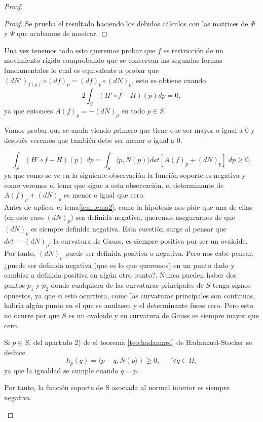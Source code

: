 \begin{proof}
\begin{proof}
		Se prueba el resultado haciendo los debidos cálculos con las matrices de $\Phi$ y $\Psi$ que acabamos de mostrar.
	\end{proof}
	
	Una vez tenemos todo esto queremos probar que $f$ es restricción de un movimiento rígido comprobando que se conservan las segundas formas fundamentales lo cual es equivalente a probar que $(dN')_{f(p)} \circ (df)_p = (df)_p \circ (dN)_p$, esto se obtiene cuando
	\[
		2\int_S (H' \circ f - H)(p) dp = 0,
	\]
	ya que entonces $A(f)_p = -(dN)_p$ en todo $p \in S$.
	
	Vamos probar que se anula viendo primero que tiene que ser mayor o igual a 0 y después veremos que también debe ser menor o igual a 0.
	
	\[
		\int_S (H' \circ f - H)(p) \; dp = \int_S \langle p, N(p) \rangle det[A(f)_p + (dN)_p] \; dp \geq 0,
	\]
	ya que como se ve en la siguiente observación la función soporte es negativa y como veremos el lema que sigue a esta observación, el determinante de $A(f)_p + (dN)_p$ es menor o igual que cero. 
${ }$\\

	Antes de aplicar el lema\ref{lem:lema2}, como la hipótesis nos pide que una de ellas (en este caso $(dN)_p$) sea definida negativa, queremos asegurarnos de que $(dN)_p$ es siempre definida negativa. Esta cuestión surge al pensar que $det \; -(dN)_p$, la curvatura de Gauss, es siempre positiva por ser un ovaloide. Por tanto, $(dN)_p$ puede ser definida positiva o negativa. Pero nos cabe pensar, ¿puede ser definida negativa (que es lo que queremos) en un punto dado y cambiar a definida positiva en algún otro punto?. Nunca pueden haber dos puntos $p_1$ y $p_2$ donde cualquiera de las curvaturas principales de $S$ tenga signos opuestos, ya que si esto ocurriera, como las curvaturas principales son continuas, habría algún punto en el que se anulasen y el determinante fuese cero. Pero esto no ocurre por que $S$ es un ovaloide y su curvatura de Gauss es siempre mayor que cero.
	
	\begin{observacion}
		Si $p \in S$, del apartado 2) de el teorema \ref{teo:hadamard} de Hadamard-Stocker se deduce
		\[
			h_p (q) = \langle p - q, N(p \rangle) \geq 0, \;\;\;\;\;\; \forall q \in \Omega,
		\]
		ya que la igualdad se cumple cuando $q = p$.
		
		Por tanto, la función soporte de S asociada al normal interior es siempre negativa.
	\end{observacion}
	

\end{proof}
